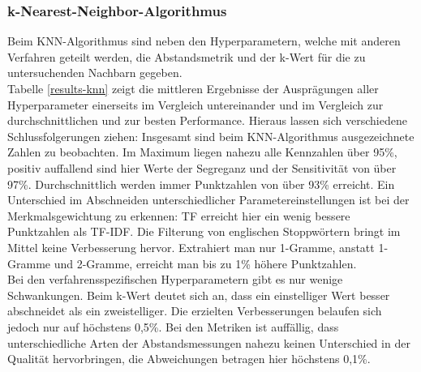 \subsubsection{k-Nearest-Neighbor-Algorithmus}
Beim KNN-Algorithmus sind neben den Hyperparametern, welche mit anderen Verfahren geteilt werden, die Abstandsmetrik und der k-Wert für die zu untersuchenden Nachbarn gegeben.\\
Tabelle \ref{results-knn} zeigt die mittleren Ergebnisse der Ausprägungen aller Hyperparameter einerseits im Vergleich untereinander und im Vergleich zur durchschnittlichen und zur besten Performance. Hieraus lassen sich verschiedene Schlussfolgerungen ziehen:
Insgesamt sind beim KNN-Algorithmus ausgezeichnete Zahlen zu beobachten. Im Maximum liegen  nahezu alle Kennzahlen über 95\%, positiv auffallend sind hier Werte der Segreganz und der Sensitivität von über 97\%. Durchschnittlich werden immer Punktzahlen von über 93\% erreicht. Ein Unterschied im Abschneiden unterschiedlicher Parametereinstellungen ist bei der Merkmalsgewichtung zu erkennen: TF erreicht hier ein wenig bessere Punktzahlen als TF-IDF. Die Filterung von englischen Stoppwörtern bringt im Mittel keine Verbesserung hervor. Extrahiert man nur 1-Gramme, anstatt 1-Gramme und 2-Gramme, erreicht man bis zu 1\% höhere Punktzahlen.\\
Bei den verfahrensspezifischen Hyperparametern gibt es nur wenige Schwankungen. Beim k-Wert deutet sich an, dass ein einstelliger Wert  besser abschneidet als ein zweistelliger. Die erzielten Verbesserungen belaufen sich jedoch nur auf höchstens 0,5\%. Bei den Metriken ist auffällig, dass unterschiedliche Arten der Abstandsmessungen nahezu keinen Unterschied in der Qualität hervorbringen, die Abweichungen betragen hier höchstens 0,1\%.\\
